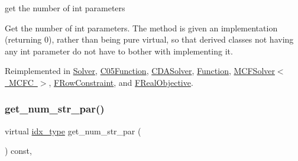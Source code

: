 get the number of int parameters 

Get the number of int parameters. The method is given an implementation (returning 0), rather than being pure virtual, so that derived classes not having any int parameter do not have to bother with implementing it. 

Reimplemented in \mbox{\hyperlink{class_s_m_spp__di__unipi__it_1_1_solver_a3ad74d9506761eb2ca4c8a936fb7a1c5}{Solver}}, \mbox{\hyperlink{class_s_m_spp__di__unipi__it_1_1_c05_function_a3ad74d9506761eb2ca4c8a936fb7a1c5}{C05\+Function}}, \mbox{\hyperlink{class_s_m_spp__di__unipi__it_1_1_c_d_a_solver_a3ad74d9506761eb2ca4c8a936fb7a1c5}{C\+D\+A\+Solver}}, \mbox{\hyperlink{class_s_m_spp__di__unipi__it_1_1_function_a3ad74d9506761eb2ca4c8a936fb7a1c5}{Function}}, \mbox{\hyperlink{class_s_m_spp__di__unipi__it_1_1_m_c_f_solver_a3ad74d9506761eb2ca4c8a936fb7a1c5}{M\+C\+F\+Solver$<$ M\+C\+F\+C $>$}}, \mbox{\hyperlink{class_s_m_spp__di__unipi__it_1_1_f_row_constraint_a3ad74d9506761eb2ca4c8a936fb7a1c5}{F\+Row\+Constraint}}, and \mbox{\hyperlink{class_s_m_spp__di__unipi__it_1_1_f_real_objective_a3ad74d9506761eb2ca4c8a936fb7a1c5}{F\+Real\+Objective}}.

\mbox{\label{class_s_m_spp__di__unipi__it_1_1_thin_compute_interface_a23ef8ba7477625aec4a54dddff053468}} 
\subsubsection{\texorpdfstring{get\+\_\+num\+\_\+str\+\_\+par()}{get\_num\_str\_par()}}
{\footnotesize\ttfamily virtual \mbox{\hyperlink{class_s_m_spp__di__unipi__it_1_1_thin_compute_interface_aa3d710629ad8c434286726ad810c3b47}{idx\+\_\+type}} get\+\_\+num\+\_\+str\+\_\+par (\begin{DoxyParamCaption}\item[{void}]{ }\end{DoxyParamCaption}) const\hspace{0.3cm}{\ttfamily [inline]}, {\ttfamily [virtual]}}



